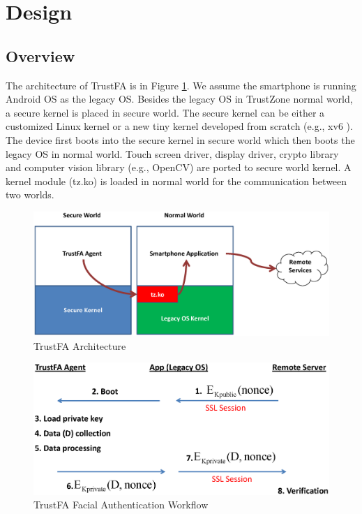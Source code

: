 \section{Design}
\label{sec:design}

\subsection{Overview}
\label{sec:design:overview}

The architecture of TrustFA is in Figure \ref{fig:arch}. We assume the
smartphone is running Android OS as the legacy OS. Besides the legacy OS in
TrustZone normal world, a secure kernel is placed in secure world. The secure
kernel can be either a customized Linux kernel or a new tiny kernel developed
from scratch (e.g., xv6 \cite{xv6}).  The device first boots into the secure
kernel in secure world which then boots the legacy OS in normal world. Touch
screen driver, display driver, crypto library and computer vision library (e.g.,
OpenCV) are ported to secure world kernel. A kernel module (tz.ko) is loaded in
normal world for the communication between two worlds.

\begin{figure}[htb]
	\centering
	\includegraphics[width=1.0\columnwidth]{figures/arch.eps}
	\caption{TrustFA Architecture}
	\label{fig:arch}
\end{figure}

\begin{figure}[htb]
	\centering
	\includegraphics[width=2.0\columnwidth]{figures/authentication.eps}
	\caption{TrustFA Facial Authentication Workflow}
	\label{fig:authentication}
\end{figure}

